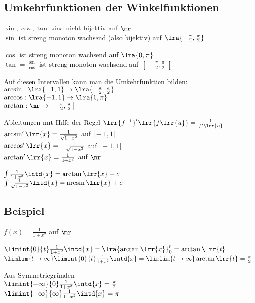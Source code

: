 \subsection{Umkehrfunktionen der Winkelfunktionen}
	$\sin, \cos, \tan$ sind nicht bijektiv auf $\mr$\\
	$\sin$ ist streng monoton wachsend (also bijektiv) auf $\lra{-\frac{\pi}{2},\frac{\pi}{2}}$
	
	
	$\cos$ ist streng monoton wachsend auf $\lra{0,\pi}$\\
	$\tan=\frac{\sin}{\cos}$ ist streng monoton wachsend auf $\left]-\frac{\pi}{2},\frac{\pi}{2}\right[$
	
	
	Auf diesen Intervallen kann man die Umkehrfunktion bilden:\\
	$\arcsin: \lra{-1,1}\rightarrow\lra{-\frac{\pi}{2},\frac{\pi}{2}}$\\
	$\arccos: \lra{-1,1}\rightarrow\lra{0,\pi}$\\
	$\arctan: \mr\rightarrow \left]-\frac{\pi}{2},\frac{\pi}{2}\right[$
	
	Ableitungen mit Hilfe der Regel $\lrr{f^{-1}}'\lrr{f\lrr{u}}=\frac{1}{f'\lrr{u}}$\\
	$\arcsin'\lrr{x}=\frac{1}{\sqrt{1-x^2}}$ auf $]-1,1[$\\
	$\arccos'\lrr{x}=-\frac{1}{\sqrt{1-x^2}}$ auf $]-1,1[$\\
	$\arctan'\lrr{x}=\frac{1}{1+x^2}$ auf $\mr$
	
	$\int\frac{1}{1+x^2}\intd{x}=\arctan\lrr{x}+c$\\
	$\int\frac{1}{\sqrt{1-x^2}}\intd{x}=\arcsin\lrr{x}+c$
	
\subsection{Beispiel}
	$f(x)=\frac{1}{1+x^2}$ auf $\mr$
	
	
	$\limint{0}{t}\frac{1}{1+x^2}\intd{x} =\lra{\arctan\lrr{x}}_0^t=\arctan\lrr{t}$\\
	$\limlim{t\rightarrow\infty}\limint{0}{t}\frac{1}{1+x^2}\intd{x}=\limlim{t\rightarrow\infty}\arctan\lrr{t}=\frac{\pi}{2}$
	
	Aus Symmetriegründen\\
	$\limint{-\infty}{0}\frac{1}{1+x^2}\intd{x}=\frac{\pi}{2}$\\
	$\limint{-\infty}{\infty}\frac{1}{1+x^2}\intd{x}=\pi$
	
